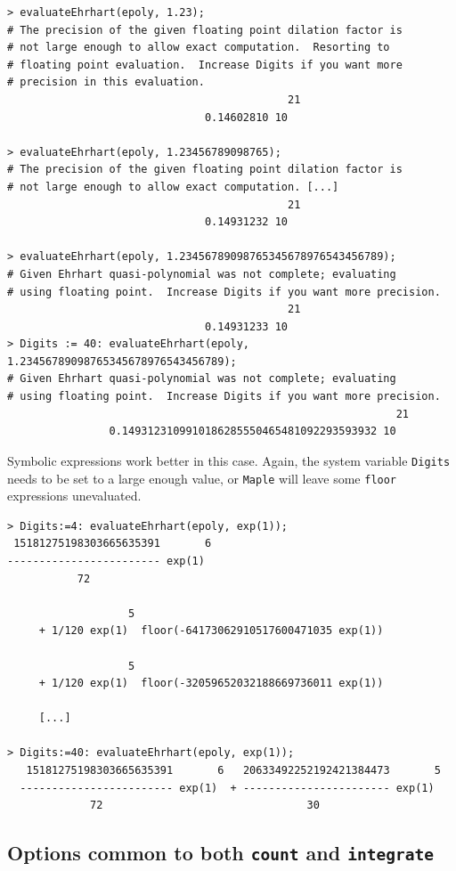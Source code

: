 \documentclass{article}
\newcommand{\maple}{{\tt Maple}\xspace}
\begin{document}
\begin{verbatim}
> evaluateEhrhart(epoly, 1.23);
# The precision of the given floating point dilation factor is
# not large enough to allow exact computation.  Resorting to 
# floating point evaluation.  Increase Digits if you want more 
# precision in this evaluation.
                                            21
                               0.14602810 10

> evaluateEhrhart(epoly, 1.23456789098765);
# The precision of the given floating point dilation factor is 
# not large enough to allow exact computation. [...]
                                            21
                               0.14931232 10

> evaluateEhrhart(epoly, 1.23456789098765345678976543456789);
# Given Ehrhart quasi-polynomial was not complete; evaluating 
# using floating point.  Increase Digits if you want more precision.
                                            21
                               0.14931233 10
> Digits := 40: evaluateEhrhart(epoly, 1.23456789098765345678976543456789);   
# Given Ehrhart quasi-polynomial was not complete; evaluating 
# using floating point.  Increase Digits if you want more precision.
                                                             21
                0.1493123109910186285550465481092293593932 10
\end{verbatim}
Symbolic expressions work better in this case.  Again, the system variable
\texttt{Digits} needs to be set to a large enough value, or \maple will leave
some \texttt{floor} expressions unevaluated.
\begin{verbatim}
> Digits:=4: evaluateEhrhart(epoly, exp(1)); 
 15181275198303665635391       6
------------------------ exp(1)
           72

                   5
     + 1/120 exp(1)  floor(-64173062910517600471035 exp(1))

                   5
     + 1/120 exp(1)  floor(-32059652032188669736011 exp(1)) 

     [...]

> Digits:=40: evaluateEhrhart(epoly, exp(1));                
   15181275198303665635391       6   20633492252192421384473       5
  ------------------------ exp(1)  + ----------------------- exp(1)
             72                                30
\end{verbatim}

\subsection{Options common to both {\tt count} and {\tt integrate}}
\end{document}
